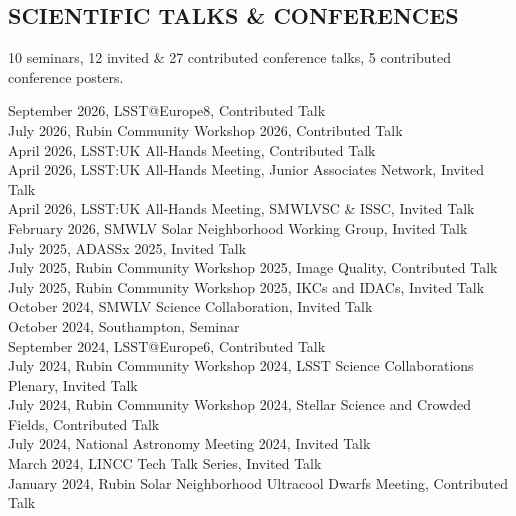 \documentclass[letter, margin, 10pt]{res} %
\begin{document}
\begin{resume}

\parskip \baselineskip
\vspace{-6pt}
\section{SCIENTIFIC TALKS \& CONFERENCES}
10 seminars, 12 invited \& 27 contributed conference talks, 5 contributed conference posters.

\vspace{-4pt}
September 2026, LSST@Europe8, Contributed Talk\\
July 2026, Rubin Community Workshop 2026, Contributed Talk\\
April 2026, LSST:UK All-Hands Meeting, Contributed Talk\\
April 2026, LSST:UK All-Hands Meeting, Junior Associates Network, Invited Talk\\
April 2026, LSST:UK All-Hands Meeting, SMWLVSC \& ISSC, Invited Talk\\
February 2026, SMWLV Solar Neighborhood Working Group, Invited Talk\\
July 2025, ADASSx 2025, Invited Talk\\
July 2025, Rubin Community Workshop 2025, Image Quality, Contributed Talk\\
July 2025, Rubin Community Workshop 2025, IKCs and IDACs, Invited Talk\\
October 2024, SMWLV Science Collaboration, Invited Talk\\
October 2024, Southampton, Seminar\\
September 2024, LSST@Europe6, Contributed Talk\\
July 2024, Rubin Community Workshop 2024, LSST Science Collaborations Plenary, Invited Talk\\
July 2024, Rubin Community Workshop 2024, Stellar Science and Crowded Fields, Contributed Talk\\
July 2024, National Astronomy Meeting 2024, Invited Talk\\
March 2024, LINCC Tech Talk Series, Invited Talk\\
January 2024, Rubin Solar Neighborhood Ultracool Dwarfs Meeting, Contributed Talk\\

\end{resume}
\end{document}
